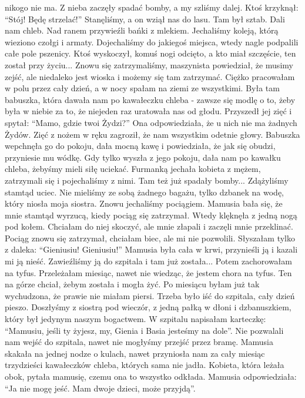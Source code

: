 nikogo nie ma. Z nieba zaczęły spadać bomby, a my szliśmy dalej. Ktoś krzyknął: "`Stój! Będę strzelać!"' Stanęliśmy, a on wziął nas do lasu. Tam był sztab. Dali nam chleb. Nad ranem przywieźli bańki z mlekiem. Jechaliśmy koleją, którą wieziono czołgi i armaty. Dojechaliśmy do jakiegoś miejsca, wtedy nagle podpalili całe pole pszenicy. Ktoś wyskoczył, komuś nogi odcięto, a kto miał szczęście, ten został przy życiu... Znowu się zatrzymaliśmy, maszynista powiedział, że musimy zejść, ale niedaleko jest wioska i możemy się tam zatrzymać. Ciężko pracowałam w polu przez cały dzień, a w nocy spałam na ziemi ze wszystkimi. Była tam babuszka, która dawała nam po kawałeczku chleba - zawsze się modlę o to, żeby była w niebie za to, że niejeden raz uratowała nas od głodu. Przyszedł jej zięć i spytał: "`Mamo, gdzie twoi Żydzi?"' Ona odpowiedziała, że u nich nie ma żadnych Żydów. Zięć z nożem w ręku zagroził, że nam wszystkim odetnie głowy. Babuszka wepchnęła go do pokoju, dała mocną kawę i powiedziała, że jak się obudzi, przyniesie mu wódkę. Gdy tylko wyszła z jego pokoju, dała nam po kawałku chleba, żebyśmy mieli siłę uciekać. Furmanką jechała kobieta z mężem, zatrzymali się i pojechaliśmy z nimi. Tam też już spadały bomby... Zdążyliśmy stamtąd uciec. Nie mieliśmy ze sobą żadnego bagażu, tylko dzbanek na wodę, który niosła moja siostra. Znowu jechaliśmy pociągiem. Mamusia bała się, że mnie stamtąd wyrzucą, kiedy pociąg się zatrzymał. Wtedy klęknęła z jedną nogą pod kołem. Chciałam do niej skoczyć, ale mnie złapali i zaczęli mnie przeklinać. Pociąg znowu się zatrzymał, chciałam biec, ale mi nie pozwolili. Słyszałam tylko z daleka: "`Gieniusiu! Gieniusiu!"' Mamusia była cała w krwi, przynieśli ją i kazali mi ją nieść. Zawieźliśmy ją do szpitala i tam już została...  Potem zachorowałam na tyfus. Przeleżałam miesiąc, nawet nie wiedząc, że jestem chora na tyfus. Ten na górze chciał, żebym została i mogła żyć. Po miesiącu byłam już tak wychudzona, że prawie nie miałam piersi. Trzeba było iść do szpitala, cały dzień pieszo. Doszłyśmy z siostrą pod wieczór, z jedną pałką w dłoni i dzbanuszkiem, który był jedynym naszym bogactwem. W szpitalu napisałam karteczkę: "`Mamusiu, jeśli ty żyjesz, my, Gienia i Basia jesteśmy na dole"'. Nie pozwalali nam wejść do szpitala, nawet nie mogłyśmy przejść przez bramę. Mamusia skakała na jednej nodze o kulach, nawet przyniosła nam za cały miesiąc trzydzieści kawałeczków chleba, których sama nie jadła. Kobieta, która leżała obok, pytała mamusię, czemu ona to wszystko odkłada.  Mamusia odpowiedziała: "`Ja nie mogę jeść. Mam dwoje dzieci, może przyjdą"'.
